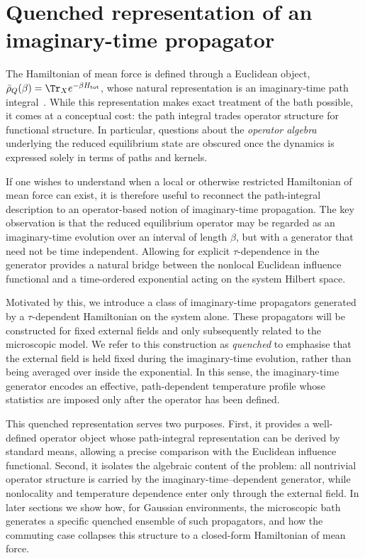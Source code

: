 \section{Quenched representation of an imaginary-time propagator\label{sec:quenched}}

The Hamiltonian of mean force is defined through a Euclidean object,
$\bar\rho_Q(\beta)=\Tr_X e^{-\beta H_{\mathrm{tot}}}$, whose natural representation
is an imaginary-time path integral~\cite{feynmanQuantumMechanicsPath1965, kleinertPathIntegralsQuantum2009}. While this representation makes exact treatment of the bath possible, it comes at a conceptual cost: the path
integral trades operator structure for functional structure. In particular,
questions about the \emph{operator algebra} underlying the reduced equilibrium
state are obscured once the dynamics is expressed solely in terms of paths and
kernels.

If one wishes to understand when a local or otherwise restricted Hamiltonian of
mean force can exist, it is therefore useful to reconnect the path-integral
description to an operator-based notion of imaginary-time propagation. The key
observation is that the reduced equilibrium operator may be regarded as an
imaginary-time evolution over an interval of length $\beta$, but with a generator
that need not be time independent. Allowing for explicit $\tau$-dependence in
the generator provides a natural bridge between the nonlocal Euclidean influence
functional and a time-ordered exponential acting on the system Hilbert space.

Motivated by this, we introduce a class of imaginary-time propagators generated
by a $\tau$-dependent Hamiltonian on the system alone. These propagators will be
constructed for fixed external fields and only subsequently related to the
microscopic model. We refer to this construction as \emph{quenched} to emphasise
that the external field is held fixed during the imaginary-time evolution,
rather than being averaged over inside the exponential. In this sense, the
imaginary-time generator encodes an effective, path-dependent temperature
profile whose statistics are imposed only after the operator has been defined.

This quenched representation serves two purposes. First, it provides a
well-defined operator object whose path-integral representation can be derived
by standard means, allowing a precise comparison with the Euclidean influence
functional. Second, it isolates the algebraic content of the problem: all
nontrivial operator structure is carried by the imaginary-time–dependent
generator, while nonlocality and temperature dependence enter only through the
external field. In later sections we show how, for Gaussian environments, the
microscopic bath generates a specific quenched ensemble of such propagators,
and how the commuting case collapses this structure to a closed-form Hamiltonian
of mean force.

